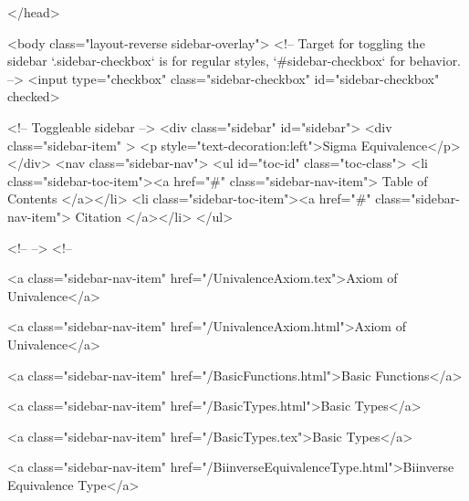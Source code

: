   
</head>




  <body class="layout-reverse sidebar-overlay">
    <!-- Target for toggling the sidebar `.sidebar-checkbox` is for regular
     styles, `#sidebar-checkbox` for behavior. -->
<input type="checkbox" class="sidebar-checkbox" id="sidebar-checkbox" checked>

<!-- Toggleable sidebar -->
<div class="sidebar" id="sidebar">
  <div class="sidebar-item" >
    <p style="text-decoration:left">Sigma Equivalence</p>
  </div>
  <nav class="sidebar-nav">
    <ul id="toc-id" class="toc-class">
  <li class="sidebar-toc-item"><a href="#" class="sidebar-nav-item"> Table of Contents </a></li>
  <li class="sidebar-toc-item"><a href="#" class="sidebar-nav-item"> Citation </a></li>
</ul>


    <!--  -->
    <!-- 
      
    
      
    
      
    
      
    
      
        
      
    
      
        
          <a class="sidebar-nav-item" href="/UnivalenceAxiom.tex">Axiom of Univalence</a>
        
      
    
      
        
          <a class="sidebar-nav-item" href="/UnivalenceAxiom.html">Axiom of Univalence</a>
        
      
    
      
        
          <a class="sidebar-nav-item" href="/BasicFunctions.html">Basic Functions</a>
        
      
    
      
        
          <a class="sidebar-nav-item" href="/BasicTypes.html">Basic Types</a>
        
      
    
      
        
          <a class="sidebar-nav-item" href="/BasicTypes.tex">Basic Types</a>
        
      
    
      
        
          <a class="sidebar-nav-item" href="/BiinverseEquivalenceType.html">Biinverse Equivalence Type</a>
        
